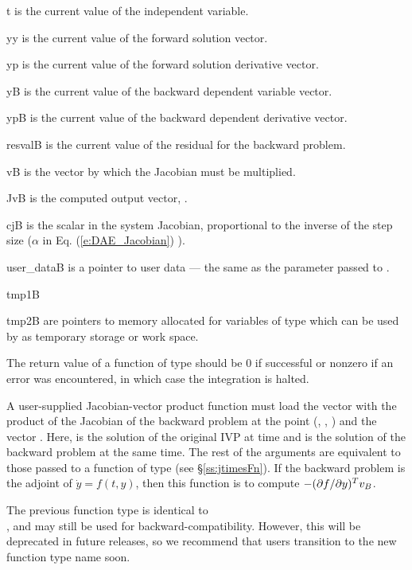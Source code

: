 {
  \begin{args}
  \item[t]
    is the current value of the independent variable.
  \item[yy]
    is the current value of the forward solution vector.
  \item[yp]
    is the current value of the forward solution derivative vector.
  \item[yB]
    is the current value of the backward dependent variable vector.
  \item[ypB]
    is the current value of the backward dependent derivative vector.
  \item[resvalB]
    is the current value of the residual for the backward problem.
  \item[vB]
    is the vector by which the Jacobian must be multiplied.
  \item[JvB]
      is the computed output vector, .
  \item[cjB]
    is the scalar in the system Jacobian, proportional to the inverse of the
    step size ($\alpha$ in Eq. (\ref{e:DAE_Jacobian}) ).
  \item[user\_dataB]
    is a pointer to user data --- the same as the 
    parameter passed to .
  \item[tmp1B]
  \item[tmp2B]
    are pointers to memory allocated for variables of type  which
    can be used by  as temporary storage or work space.
  \end{args}
}
{
  The return value of a function of type  should be
  $0$ if successful or nonzero if an error was encountered, in which case
  the integration is halted.
}
{
  A user-supplied Jacobian-vector product function must load the vector 
  with the product of the Jacobian of the backward problem
  at the point (, , ) and the vector .
  Here,  is the solution of the original IVP at time  and
   is the solution of the backward problem at the same time.
  The rest of the arguments are equivalent to those passed to a function of type
   (see \S\ref{ss:jtimesFn}).
  If the backward problem is the adjoint of ${\dot y} = f(t, y)$, then this
  function is to compute $-(\partial f / \partial y)^T v_B$.

  The previous function type  is identical to
  \\ \noindent {}, and may still be used for
  backward-compatibility.  However, this will be deprecated in future
  releases, so we recommend that users transition to the new function
  type name soon.
}
